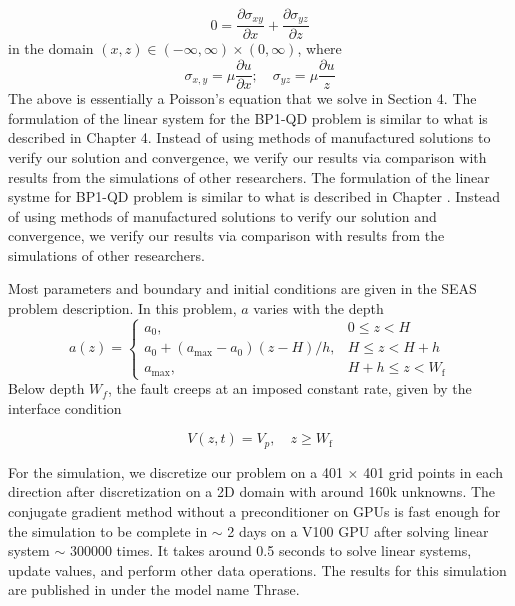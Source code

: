 \begin{equation}
    0 = \frac{\partial \sigma_{xy}}{\partial x} + \frac{\partial \sigma_{yz}}{\partial z}
\end{equation}
in the domain $(x,z) \in (-\infty, \infty) \times (0,\infty)$, where
\begin{equation}
    \sigma_{x,y} = \mu \frac{\partial u}{\partial x}; \quad \sigma_{yz} = \mu \frac{\partial u}{z}
\end{equation}
The above is essentially a Poisson's equation that we solve in Section 4.
The formulation of the linear system for the BP1-QD problem is similar to what is described in Chapter 4.
Instead of using methods of manufactured solutions to verify our solution and convergence, we verify our results via comparison with results from the simulations of other researchers.
The formulation of the linear systme for BP1-QD problem is similar to what is described in Chapter \label{chap:matrix-free}.
Instead of using methods of manufactured solutions to verify our solution and convergence, we verify our results via comparison with results from the simulations of other researchers.

Most parameters and boundary and initial conditions are given in the SEAS problem description. In this problem, $a$ varies with the depth
\begin{equation}
a(z) = 
\begin{cases} 
a_0, & 0 \leq z < H \\
a_0 + (a_{\text{max}} - a_0)(z - H)/h, & H \leq z < H + h \\
a_{\text{max}}, & H + h \leq z < W_\text{f} 
\end{cases}
\end{equation}
Below depth $W_f$, the fault creeps at an imposed constant rate, given by the interface condition

\begin{equation}
    V(z,t) = V_p, \quad z \geq W_\text{f}
\end{equation}

For the simulation, we discretize our problem on a 401 $\times$ 401 grid points in each direction after discretization on a 2D domain with around 160k unknowns. 
The conjugate gradient method without a preconditioner on GPUs is fast enough for the simulation to be complete in $\sim$ 2 days on a V100 GPU after solving linear system $\sim$ 300000 times.
It takes around 0.5 seconds to solve linear systems, update values, and perform other data operations.
The results for this simulation are published in \cite{erickson2023incorporating} under the model name Thrase.


